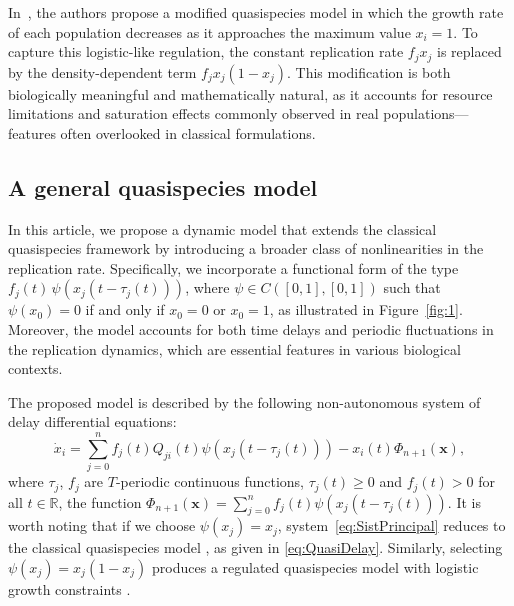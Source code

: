 \documentclass[11pt,reqno]{amsart}
\theoremstyle{definition}
\def\R{\mathbb{R}}
\begin{document}
In~\cite{Zapata:2022aa}, the authors propose a modified quasispecies model in which the growth rate of each population decreases as it approaches the maximum value $x_i = 1$. To capture this logistic-like regulation, the constant replication rate $f_j x_j$ is replaced by the density-dependent term $f_jx_j(1 - x_j)$. This modification is both biologically meaningful and mathematically natural, as it accounts for resource limitations and saturation effects commonly observed in real populations—features often overlooked in classical formulations.

\subsection{A general quasispecies model}
In this article, we propose a dynamic model that extends the classical quasispecies framework by introducing a broader class of nonlinearities in the replication rate. Specifically, we incorporate a functional form of the type $f_j(t) \, \psi(x_j(t - \tau_j(t)))$, where $\psi\in C([0,1],[0,1])$ such that $\psi(x_0)=0$ if and only if $x_0=0$ or $x_0=1$, as illustrated in Figure~\ref{fig:1}. Moreover, the model accounts for both time delays and periodic fluctuations in the replication dynamics, which are essential features in various biological contexts.

The proposed model is described by the following non-autonomous system of delay differential equations:
\begin{equation}\label{eq:SistPrincipal}
\dot{x}_i = \sum_{j=0}^n f_j(t) Q_{ji} (t)\psi(x_j(t - \tau_j(t))) - x_i(t) \Phi_{n+1}(\mathbf{x}),
\end{equation}
where $\tau_{j}$, $f_j$ are $T$-periodic continuous functions, $\tau_{j}(t)\geq 0$ and $f_j(t)>0$ for all $t\in\R$, the function $\Phi_{n+1}(\mathbf{x})=\sum_{j=0}^n f_j(t) \psi(x_j(t - \tau_j(t))).$
It is worth noting that if we choose $\psi(x_j) = x_j$, system~\eqref{eq:SistPrincipal} reduces to the classical quasispecies model \cite{TurnerQuasi1}, as given in \eqref{eq:QuasiDelay}. Similarly, selecting $\psi(x_j) = x_j(1 - x_j)$ produces a regulated quasispecies model with logistic growth constraints \cite{Zapata:2022aa}.
\end{document}
